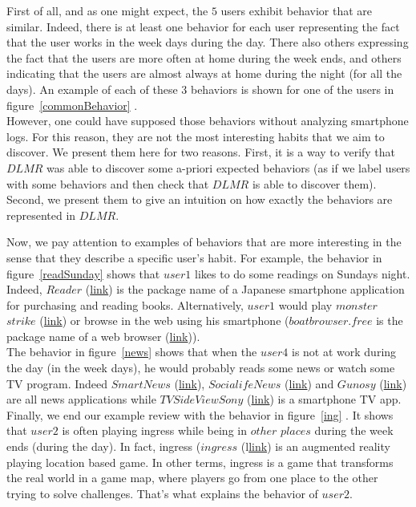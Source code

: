 First of all, and as one might expect, the $5$ users exhibit behavior that are similar. Indeed, there is at least one behavior for each user representing the fact that the user works in the week days during the day. There also others expressing the fact that the users are more often at home during the week ends, and others indicating that the users are almost always at home during the night (for all the days). An example of each of these $3$ behaviors is shown for one of the users in figure~\ref{commonBehavior} . 
\\However, one could have supposed those behaviors without analyzing smartphone logs. For this reason, they are not the most interesting habits that we aim to discover. We present them here for two reasons. First, it is a way to verify that $DLMR$ was able to discover some a-priori expected behaviors (as if we label users with some behaviors and then check that $DLMR$ is able to discover them). Second, we present them to give an intuition on how exactly the behaviors are represented in $DLMR$. \par

Now, we pay attention to examples of behaviors that are more interesting in the sense that they describe a specific user's habit. For example, the behavior in figure~\ref{readSunday} shows that $user1$ likes to do some readings on Sundays night. Indeed, $Reader$ (\href{https://play.google.com/store/apps/details?id=com.sony.drbd.reader.ext.pictorial.ja&hl=fr}{link}) is the package name of a Japanese smartphone application for purchasing and reading books. Alternatively, $user1$ would play $monster$ $strike$ (\href{https://play.google.com/store/apps/details?id=jp.co.mixi.monsterstrikeUS&hl=fr}{link}) or browse in the web using his smartphone ($boatbrowser.free$ is the package name of a web browser (\href{https://play.google.com/store/apps/details?id=com.boatbrowser.free&hl=fr}{link})). 
\\The behavior in figure~\ref{news} shows that when the $user4$ is not at work during the day (in the week days), he would probably reads some news or watch some TV program. Indeed $SmartNews$ (\href{https://play.google.com/store/apps/details?id=jp.gocro.smartnews.android}{link}), $Socialife News$ (\href{https://play.google.com/store/apps/details?id=com.sony.nfx.app.sfrc&hl=fr}{link}) and $Gunosy$ (\href{https://play.google.com/store/apps/details?id=com.gunosy.android.world}{link}) are all news applications while $TV SideView Sony$ (\href{https://play.google.com/store/apps/details?id=com.sony.tvsideview.phone&hl=fr}{link}) is a smartphone TV app.
\\Finally, we end our example review with the behavior in figure~\ref{ing} . It shows that $user2$ is often playing ingress while being in $other$ $places$ during the week ends (during the day). In fact, ingress ($ingress$ (l\href{https://play.google.com/store/apps/details?id=com.nianticproject.ingress&hl=fr}{link}) is an augmented reality playing location based game. In other terms, ingress is a game that transforms the real world in a game map, where players go from one place to the other trying to solve challenges. That's what explains the behavior of $user2$. \par

